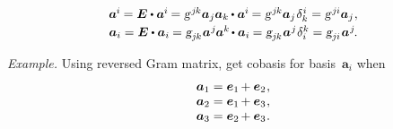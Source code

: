 \begin{otherlanguage}{russian}
\nopagebreak\vspace{-0.12em}
\begin{equation}\begin{array}{c}
\bm{a}^{\hspace{-0.05ex}i} \hspace{-0.1ex}
= \bm{E} \dotp \bm{a}^{\hspace{-0.05ex}i} \hspace{-0.15ex}
= \textsl{g}^{\hspace{.2ex}j\hspace{-0.1ex}k} \bm{a}_j \bm{a}_k \hspace{-0.1ex} \dotp \bm{a}^{\hspace{-0.05ex}i} \hspace{-0.15ex}
= \textsl{g}^{\hspace{.2ex}j\hspace{-0.1ex}k} \bm{a}_j \hspace{.16ex} \delta_{k}^{\hspace{.1ex}i}
= \textsl{g}^{\hspace{.2ex}j\hspace{-0.06ex}i} \bm{a}_j \hspace{.1ex} ,
\\[.25em]
%
\bm{a}_i
= \bm{E} \dotp \bm{a}_i \hspace{-0.1ex}
= \textsl{g}_{j\hspace{-0.1ex}k} \hspace{.1ex} \bm{a}^{\hspace{.1ex}j} \hspace{-0.1ex} \bm{a}^{k} \hspace{-0.2ex} \dotp \bm{a}_i \hspace{-0.1ex}
= \textsl{g}_{j\hspace{-0.1ex}k} \hspace{.1ex} \bm{a}^{\hspace{.1ex}j} \hspace{.1ex} \delta_{i}^{k}
= \textsl{g}_{j\hspace{-0.06ex}i} \hspace{.16ex} \bm{a}^{\hspace{.1ex}j} \hspace{-0.2ex} .
\end{array}\end{equation}

\begin{tcolorbox}
\small\setlength{\abovedisplayskip}{2pt}\setlength{\belowdisplayskip}{2pt}

\emph{Example.} Using reversed Gram matrix, get cobasis for basis~$\bm{a}_i$ when
\[ \begin{array}{l}
\bm{a}_1 = \bm{e}_1 \hspace{-0.2ex} + \bm{e}_2 \hspace{.1ex},\\
\bm{a}_2 = \bm{e}_1 \hspace{-0.2ex} + \bm{e}_3 \hspace{.1ex},\\
\bm{a}_3 = \bm{e}_2 \hspace{-0.2ex} + \bm{e}_3 \hspace{.1ex}.
\end{array} \]


\end{tcolorbox}
\end{otherlanguage}
